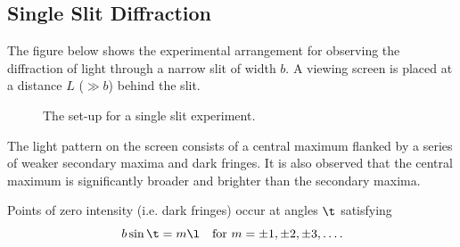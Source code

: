 \subsection{Single Slit Diffraction}

The figure below shows the experimental arrangement for observing the diffraction of light through a narrow slit of width $b$. A viewing screen is placed at a distance $L$ ($\gg b$) behind the slit.

\begin{figure}[H]
    \centering
    \caption{The set-up for a single slit experiment.}
\end{figure}

The light pattern on the screen consists of a central maximum flanked by a series of weaker secondary maxima and dark fringes. It is also observed that the central maximum is significantly broader and brighter than the secondary maxima.

\begin{proposition}
    Points of zero intensity (i.e. dark fringes) occur at angles $\t$ satisfying \[b \sin \t = m \l \quad \text{for $m = \pm 1, \pm 2, \pm 3, \dots$}.\]
\end{proposition}

